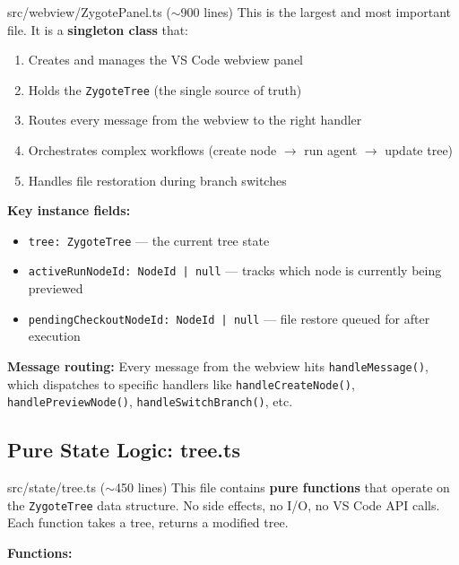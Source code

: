 \documentclass[12pt, a4paper]{article}
\begin{document}
\begin{filebox}{src/webview/ZygotePanel.ts \quad ($\sim$900 lines)}
This is the largest and most important file. It is a \textbf{singleton class} that:

\begin{enumerate}
    \item Creates and manages the VS Code webview panel
    \item Holds the \texttt{ZygoteTree} (the single source of truth)
    \item Routes every message from the webview to the right handler
    \item Orchestrates complex workflows (create node $\to$ run agent $\to$ update tree)
    \item Handles file restoration during branch switches
\end{enumerate}

\textbf{Key instance fields:}
\begin{itemize}
    \item \texttt{tree: ZygoteTree} --- the current tree state
    \item \texttt{activeRunNodeId: NodeId | null} --- tracks which node is currently being previewed
    \item \texttt{pendingCheckoutNodeId: NodeId | null} --- file restore queued for after execution
\end{itemize}

\textbf{Message routing:}
Every message from the webview hits \texttt{handleMessage()}, which dispatches to specific handlers like \texttt{handleCreateNode()}, \texttt{handlePreviewNode()}, \texttt{handleSwitchBranch()}, etc.
\end{filebox}

\subsection{Pure State Logic: tree.ts}

\begin{filebox}{src/state/tree.ts \quad ($\sim$450 lines)}
This file contains \textbf{pure functions} that operate on the \texttt{ZygoteTree} data structure. No side effects, no I/O, no VS Code API calls. Each function takes a tree, returns a modified tree.

\textbf{Functions:}
\end{filebox}
\end{document}
